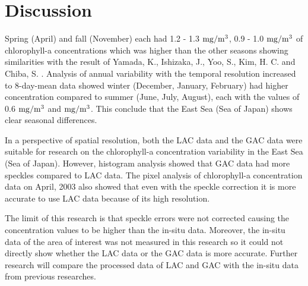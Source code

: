 \section{Discussion}
Spring (April) and fall (November) each had 1.2 - 1.3 $\rm mg/m^3$, 0.9 - 1.0 $\rm mg/m^3$ of chlorophyll-a concentrations which was higher than the other seasons showing similarities with the result of Yamada, K., Ishizaka, J., Yoo, S., Kim, H. C. and Chiba, S. \cite{yamada2004seasonal}. Analysis of annual variability with the temporal resolution increased to 8-day-mean data showed winter (December, January, February) had higher concentration compared to summer (June, July, August), each with the values of 0.6 $\rm mg/m^3$ and $\rm mg/m^3$. This conclude that the East Sea (Sea of Japan) shows clear seasonal differences.

In a perspective of spatial resolution, both the LAC data and the GAC data were suitable for research on the chlorophyll-a concentration variability in the East Sea (Sea of Japan). However, histogram analysis showed that GAC data had more speckles compared to LAC data. The pixel analysis of chlorophyll-a concentration data on April, 2003 also showed that even with the speckle correction it is more accurate to use LAC data because of its high resolution.

The limit of this research is that speckle errors were not corrected causing the concentration values to be higher than the in-situ data. Moreover, the in-situ data of the area of interest was not measured in this research so it could not directly show whether the LAC data or the GAC data is more accurate. Further research will compare the processed data of LAC and GAC with the in-situ data from previous researches.
